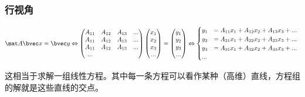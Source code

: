 \subsubsection{行视角}
$$
\mat A \bvec x=\bvec y \Leftrightarrow 
\begin{pmatrix}
A_{11}&A_{12}&A_{13}&...\\
A_{11}&A_{12}&A_{13}&...\\
A_{11}&A_{12}&A_{13}&...\\
...
\end{pmatrix}
\begin{pmatrix}
x_{1}\\
x_{2}\\
x_{3}\\
...\\
\end{pmatrix}
=
\begin{pmatrix}
y_{1}\\
y_{2}\\
y_{3}\\
...\\
\end{pmatrix}
\Leftrightarrow 
\begin{cases}
y_1&=A_{11}x_1+A_{12}x_2+A_{13}x_3+...\\
y_2&=A_{21}x_1+A_{22}x_2+A_{23}x_3+...\\
y_3&=A_{31}x_1+A_{32}x_2+A_{33}x_3+...\\
...&\\
\end{cases}~
$$

这相当于求解一组线性方程。其中每一条方程可以看作某种（高维）直线，方程组的解就是这些直线的交点。

